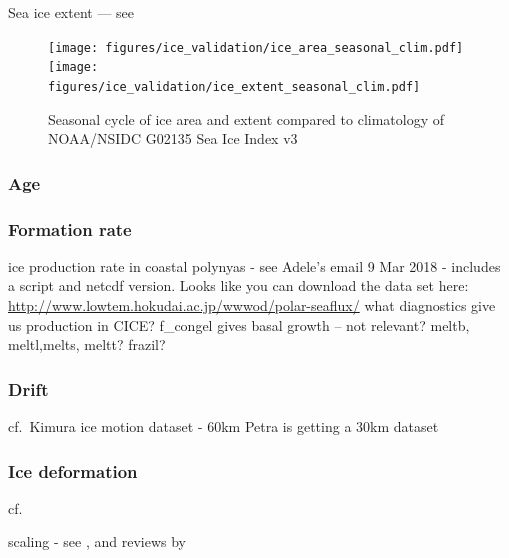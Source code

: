 \documentclass[11pt]{article}
\begin{document}
Sea ice extent --- see \citet{IvanovaGlecklerTaylorDurackMarvel2016a}


\begin{figure}[ht]
\texttt{[image: figures/ice\_validation/ice\_area\_seasonal\_clim.pdf]}
\texttt{[image: figures/ice\_validation/ice\_extent\_seasonal\_clim.pdf]}
\caption{Seasonal cycle of ice area and extent compared to climatology of NOAA/NSIDC G02135 Sea Ice Index v3 \citep[][\url{http://nsidc.org/data/g02135}]{FettererKnowlesMeierSavoieWindnagel2017a}}
\label{F:iceareaextentseasonalclim}
\end{figure}

\subsubsection{Age}
\subsubsection{Formation rate}
ice production rate in coastal polynyas \citep{TamuraOhshimaNihashi2008a,TamuraOhshima2011a,TamuraOhshimaFraserWilliams2016a,NihashiOhshima2015a,OhshimaNihashiIwamoto2016a}
- see Adele's email 9 Mar 2018 - includes a script and netcdf version.
Looks like you can download the data set here:
\url{http://www.lowtem.hokudai.ac.jp/wwwod/polar-seaflux/}
what diagnostics give us production in CICE? f_congel gives basal growth -- not relevant?
meltb, meltl,melts, meltt?
frazil?



\subsubsection{Drift}
cf.\ Kimura ice motion dataset - 60km
Petra is getting a 30km dataset

\citet{GilesMassomHeilHyland2011a}
\citet{SumataETAL2014a, SumataKwokGerdesKaukerKarcher2015a, SumataGerdesKaukerKarcher2015a, SzanyiLukovichBarberHaller2016a}
\citet{KwokPangKacimi2017a} %

\subsubsection{Ice deformation}
cf. \citet{HutchingsRobertsGeigerRichter-Menge2011a}

scaling - see \citet{HutterLoschMenemenlis2018a}, \citet{GirardWeissMolinesBarnierBouillon2009a} and reviews by \citet{Weiss2003a, Weiss2017a, WeissDansereau2017a}
\end{document}
